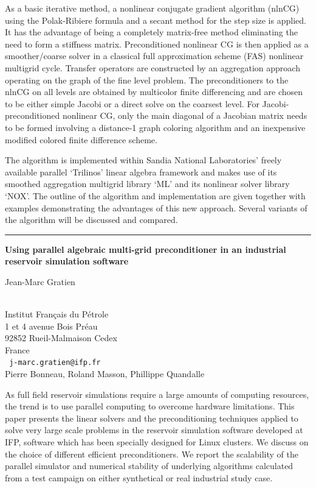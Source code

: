 \documentclass[twosided]{report}
\begin{document}
As a basic iterative method, a nonlinear conjugate gradient algorithm
(nlnCG) using the Polak-Ribiere formula and a secant method for the
step size is applied. It has the advantage of being a completely
matrix-free method eliminating the need to form a stiffness matrix.
Preconditioned nonlinear CG is then applied as a smoother/coarse solver
in a classical full approximation scheme (FAS) nonlinear multigrid
cycle. Transfer operators are constructed by an aggregation approach
operating on the graph of the fine level problem. The preconditioners
to the nlnCG on all levels are obtained by multicolor finite
differencing and are chosen to be either simple Jacobi or a direct
solve on the coarsest level.
For Jacobi-preconditioned nonlinear CG, only the main diagonal of a
Jacobian matrix needs to be formed involving a distance-1 graph
coloring algorithm and an inexpensive modified colored finite
difference scheme.


The algorithm is implemented within Sandia National Laboratories'
freely available parallel `Trilinos' linear algebra framework and makes
use of its smoothed aggregation multigrid library `ML' and its
nonlinear solver library `NOX'. The outline of the algorithm and
implementation are given together with examples demonstrating the
advantages of this new approach. Several variants of the algorithm will
be discussed and compared.

\begin{center}

\rule{6in}{1pt}
\end{center}

\begin{center}
{\large			\label{gratien}
{\bf
Using parallel algebraic multi-grid preconditioner in an industrial
reservoir simulation software
}

Jean-Marc Gratien} \\
Institut Fran\c{c}ais du P\'{e}trole
\\
1 et 4 avenue Bois Pr\'{e}au
\\
92852 Rueil-Malmaison Cedex
\\
France
\\ {\tt
j-marc.gratien@ifp.fr
}
\\
Pierre Bonneau,
Roland Masson,
Phillippe Quandalle
\end{center}

As full field reservoir simulations require a large amounts of
computing resources, the trend is to use parallel computing to overcome
hardware limitations. This paper presents the linear solvers and the
preconditioning techniques applied to solve very large scale problems
in the reservoir simulation software developed at IFP, software which
has been specially designed for Linux clusters. We discuss on the
choice of different efficient preconditioners. We report the
scalability of the parallel simulator and numerical stability of
underlying algorithms calculated from a test campaign on either
synthetical or real industrial study case.
\end{document}

